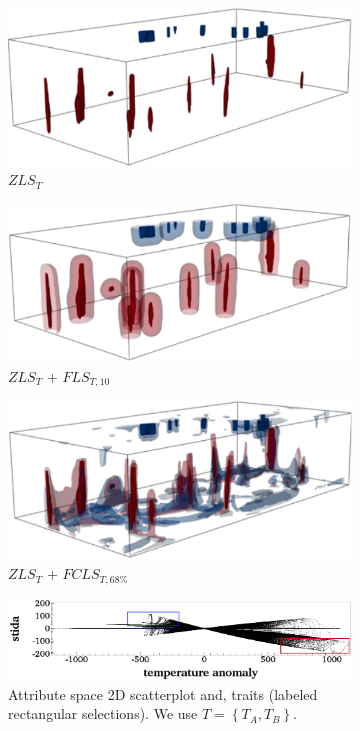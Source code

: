 \begin{figure}[h]
\begin{subfigure}{0.24\linewidth}
\centering
\includegraphics[width=\linewidth]{Images/Mantel/zls.pdf}
\caption{$ZLS_{T}$}
\label{}
\end{subfigure}
\begin{subfigure}{0.24\linewidth}
\centering
\includegraphics[width=\linewidth]{Images/Mantel/fls_10.pdf}
\caption{$ZLS_{T}$ + $FLS_{T,10}$}
\label{}
\end{subfigure}
\begin{subfigure}{0.24\linewidth}
\centering
\includegraphics[width=\linewidth]{Images/Mantel/fcls_68.pdf}
\caption{$ZLS_{T}$ + $FCLS_{T,68\%}$}
\label{}
\end{subfigure}
\begin{subfigure}{0.24\linewidth}
\centering
\includegraphics[width=0.95\linewidth]{Images/Mantel/scatterplot.pdf}
\caption{Attribute space 2D scatterplot and, traits (labeled rectangular selections). We use $T = \left\{T_{A}, T_{B}\right\}$.} 
\label{}
\end{subfigure}
\caption{}
\label{}
\end{figure}
